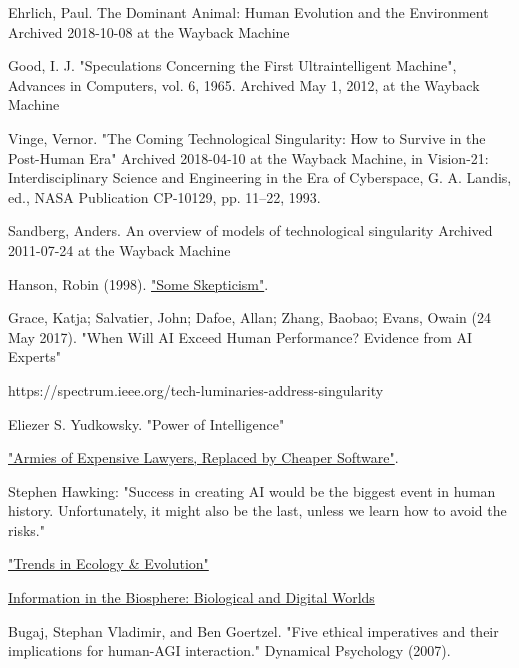 \documentclass[a4paper]{article}
\begin{document}
\appendix

\begin{thebibliography}{9}

 Ehrlich, Paul. The Dominant Animal: Human Evolution and the Environment Archived 2018-10-08 at the Wayback Machine


  Good, I. J. "Speculations Concerning the First Ultraintelligent Machine", Advances in Computers, vol. 6, 1965. Archived May 1, 2012, at the Wayback Machine
 
   Vinge, Vernor. "The Coming Technological Singularity: How to Survive in the Post-Human Era" Archived 2018-04-10 at the Wayback Machine, in Vision-21: Interdisciplinary Science and Engineering in the Era of Cyberspace, G. A. Landis, ed., NASA Publication CP-10129, pp. 11–22, 1993.


 Sandberg, Anders. An overview of models of technological singularity Archived 2011-07-24 at the Wayback Machine

 Hanson, Robin (1998). \href{https://mason.gmu.edu/~rhanson/vc.html#hanson}{"Some Skepticism"}.

 Grace, Katja; Salvatier, John; Dafoe, Allan; Zhang, Baobao; Evans, Owain (24 May 2017). "When Will AI Exceed Human Performance? Evidence from AI Experts"

 https://spectrum.ieee.org/tech-luminaries-address-singularity

 Eliezer S. Yudkowsky. "Power of Intelligence"

\href{https://www.nytimes.com/2011/03/05/science/05legal.html}{"Armies of Expensive Lawyers, Replaced by Cheaper Software"}.

Stephen Hawking: "Success in creating AI would be the biggest event in human history. Unfortunately, it might also be the last, unless we learn how to avoid the risks."

\href{https://www.sciencedirect.com/science/article/abs/pii/S0169534703003458}{"Trends in Ecology \& Evolution"}


\href{https://escholarship.org/uc/item/38f4b791}{Information in the Biosphere: Biological and Digital Worlds}

  Bugaj, Stephan Vladimir, and Ben Goertzel. "Five ethical imperatives and their implications for human-AGI interaction." Dynamical Psychology (2007).


\end{thebibliography}
\end{document}
